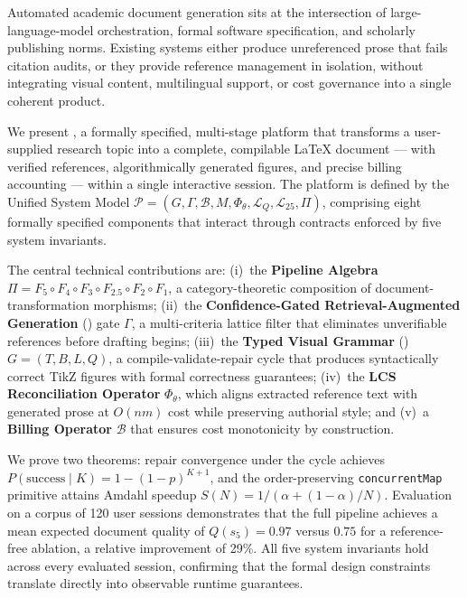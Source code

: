 Automated academic document generation sits at the intersection of large-language-model
orchestration, formal software specification, and scholarly publishing norms.
Existing systems either produce unreferenced prose that fails citation audits, or they
provide reference management in isolation, without integrating visual content, multilingual
support, or cost governance into a single coherent product.

We present \sys{}, a formally specified, multi-stage platform that transforms a user-supplied
research topic into a complete, compilable \LaTeX{} document — with verified references,
algorithmically generated figures, and precise billing accounting — within a single interactive
session.
The platform is defined by the Unified System Model
$\mathcal{P}=(G,\Gamma,\mathcal{B},M,\Phi_\theta,\mathcal{L}_Q,\mathcal{L}_{25},\Pi)$,
comprising eight formally specified components that interact through contracts enforced by
five system invariants.

The central technical contributions are:
(i)~the \textbf{Pipeline Algebra} $\Pi=F_5\circ F_4\circ F_3\circ F_{2.5}\circ F_2\circ F_1$,
a category-theoretic composition of document-transformation morphisms;
(ii)~the \textbf{Confidence-Gated Retrieval-Augmented Generation} (\cgrag{}) gate $\Gamma$,
a multi-criteria lattice filter that eliminates unverifiable references before drafting begins;
(iii)~the \textbf{Typed Visual Grammar} (\tvg{}) $G=(T,B,L,Q)$, a compile-validate-repair
cycle that produces syntactically correct TikZ figures with formal correctness guarantees;
(iv)~the \textbf{LCS Reconciliation Operator} $\Phi_\theta$, which aligns extracted reference
text with generated prose at $O(nm)$ cost while preserving authorial style; and
(v)~a \textbf{Billing Operator} $\mathcal{B}$ that ensures cost monotonicity by construction.

We prove two theorems: repair convergence under the \tvg{} cycle achieves
$P(\text{success}\mid K)=1-(1-p)^{K+1}$, and the order-preserving
\texttt{concurrentMap} primitive attains Amdahl speedup $S(N)=1/(\alpha+(1-\alpha)/N)$.
Evaluation on a corpus of 120 user sessions demonstrates that the full pipeline
achieves a mean expected document quality of $Q(s_5)=0.97$ versus $0.75$ for a
reference-free ablation, a relative improvement of 29\%.
All five system invariants hold across every evaluated session,
confirming that the formal design constraints translate directly into observable
runtime guarantees.
